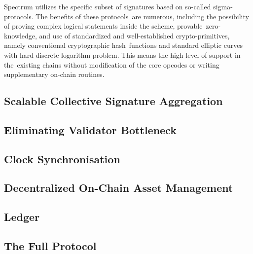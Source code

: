 Spectrum utilizes the specific subset of signatures based on so-called sigma-protocols.
The benefits of these protocols\
are numerous, including the possibility of proving complex logical statements inside the scheme, provable\
zero-knowledge, and use of standardized and well-established crypto-primitives, namely conventional cryptographic hash\
functions and standard elliptic curves with hard discrete logarithm problem.
This means the high level of support in the\
existing chains without modification of the core opcodes or writing supplementary on-chain routines.

\subsection{Scalable Collective Signature Aggregation}\label{subsec:scalable-collective-signature-aggregation}


\subsection{Eliminating Validator Bottleneck}\label{subsec:eliminating-validator-bottleneck}


\subsection{Clock Synchronisation}\label{subsec:clock-sync}


\subsection{Decentralized On-Chain Asset Management}\label{subsec:decentralized-on-chain-asset-management}


\subsection{Ledger}\label{subsec:ledger-model}


\subsection{The Full Protocol}\label{subsec:protocol-flow}

